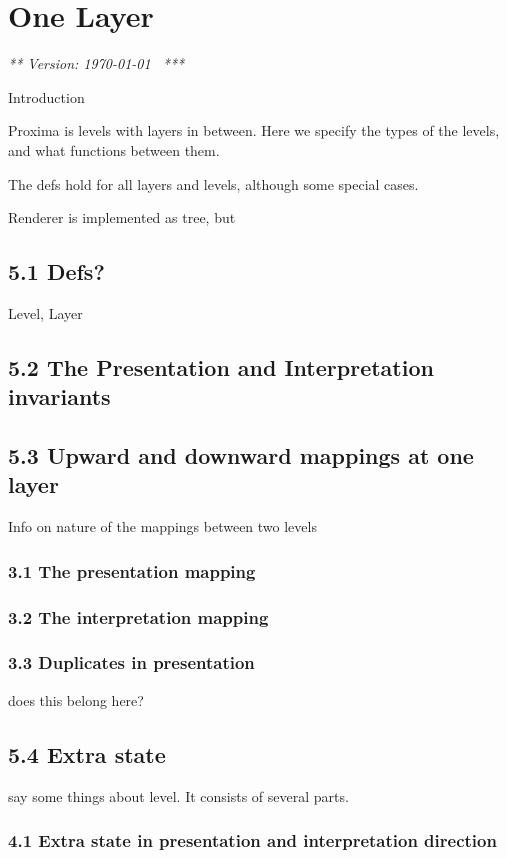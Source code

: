 \chapter{One Layer}
\label{chap:singleLayer}

{\em *** Version: \today~ ***}


Introduction

Proxima is levels with layers in between.
Here we specify the types of the levels, and what functions between them.

The defs hold for all layers and levels, although some special cases.

Renderer is implemented as tree, but

\section{5.1 Defs?}
Level, Layer

\section{5.2 The Presentation and Interpretation invariants}

\section{5.3 Upward and downward mappings at one layer}
 Info on nature of the mappings between two levels
   \subsection{3.1 The presentation mapping}
   \subsection{3.2 The interpretation mapping}
   \subsection{3.3 Duplicates in presentation}
    does this belong here?
    
\section{5.4 Extra state}
 say some things about level. It consists of several parts. 
 
   \subsection{4.1 Extra state in presentation and interpretation direction}
      
